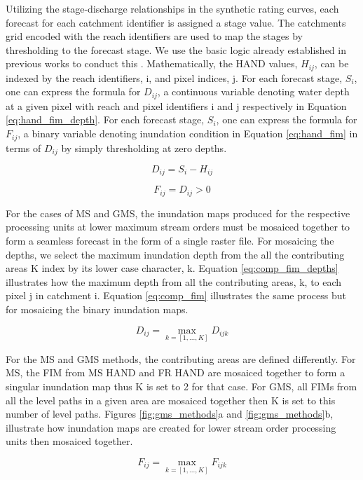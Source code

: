 Utilizing the stage-discharge relationships in the synthetic rating curves, each forecast for each catchment identifier is assigned a stage value. 
The catchments grid encoded with the reach identifiers are used to map the stages by thresholding to the forecast stage.
We use the basic logic already established in previous works to conduct this \cite{nobre2016hand,liu2016cybergis,maidment2017conceptual}.
Mathematically, the HAND values, $H_{ij}$, can be indexed by the reach identifiers, i, and pixel indices, j.
For each forecast stage, $S_i$, one can express the formula for $D_{ij}$, a continuous variable denoting water depth at a given pixel with reach and pixel identifiers i and j respectively in Equation \ref{eq:hand_fim_depth}.
For each forecast stage, $S_i$, one can express the formula for $F_{ij}$, a binary variable denoting inundation condition in Equation \ref{eq:hand_fim} in terms of $D_{ij}$ by simply thresholding at zero depths.
%
\begin{linenomath*}
\begin{equation}
\label{eq:hand_fim_depth}
    D_{ij} = S_i - H_{ij}
\end{equation}
\end{linenomath*}
%
\begin{linenomath*}
\begin{equation}
\label{eq:hand_fim}
    F_{ij} = D_{ij} > 0
\end{equation}
\end{linenomath*}
%
For the cases of MS and GMS, the inundation maps produced for the respective processing units at lower maximum stream orders must be mosaiced together to form a seamless forecast in the form of a single raster file.
For mosaicing the depths, we select the maximum inundation depth from the all the contributing areas K index by its lower case character, k.
Equation \ref{eq:comp_fim_depths} illustrates how the maximum depth from all the contributing areas, k, to each pixel j in catchment i.
Equation \ref{eq:comp_fim} illustrates the same process but for mosaicing the binary inundation maps.
%
\begin{linenomath*}
\begin{equation}
\label{eq:comp_fim_depths}
    D_{ij} = \max_{k=[1,...,K]} D_{ijk}
\end{equation}
\end{linenomath*}
%
For the MS and GMS methods, the contributing areas are defined differently.
For MS, the FIM from MS HAND and FR HAND are mosaiced together to form a singular inundation map thus K is set to 2 for that case.
For GMS, all FIMs from all the level paths in a given area are mosaiced together then K is set to this number of level paths.
Figures \ref{fig:gms_methods}a and \ref{fig:gms_methods}b, illustrate how inundation maps are created for lower stream order processing units then mosaiced together.
%
\begin{linenomath*}
\begin{equation}
\label{eq:comp_fim}
    F_{ij} = \max_{k=[1,...,K]} F_{ijk}
\end{equation}
\end{linenomath*}
%
